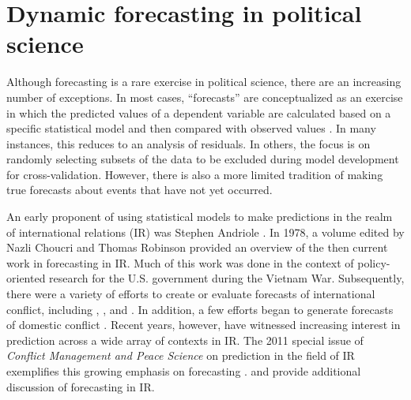 \section{Dynamic forecasting in political science}
Although forecasting is a rare exercise in political science, there
are an increasing number of exceptions.  In most cases, ``forecasts''
are conceptualized as an exercise in which the predicted values of a
dependent variable are calculated based on a specific statistical
model and then compared with observed values
\citep[e.g.,][]{Hildebrand:etal:1976}. In many instances, this reduces
to an analysis of residuals.  In others, the focus is on randomly
selecting subsets of the data to be excluded during model development
for cross-validation.  However, there is also a more limited tradition
of making true forecasts about events that have not yet occurred.

An early proponent of using statistical models to make predictions in
the realm of international relations (IR) was Stephen Andriole
\citep{Andriole:Young:1977}. In 1978, a volume edited by Nazli Choucri
and Thomas Robinson \nocite{Choucri:Robinson:1978} provided an
overview of the then current work in forecasting in IR.  Much of this
work was done in the context of policy-oriented research for the
U.S. government during the Vietnam War.  Subsequently, there were a
variety of efforts to create or evaluate forecasts of international
conflict, including \citet{Freeman:Job:1979},
\citet{Singer:Wallace:1979}, and \citet{Vincent:1980}.  In addition, a
few efforts began to generate forecasts of domestic conflict
\citep[e.g.,][]{Gurr:Lichbach:1986}.  Recent years, however, have
witnessed increasing interest in prediction across a wide array of
contexts in IR.  The 2011 special issue of \emph{Conflict
  Management and Peace Science} on prediction in the field of IR
exemplifies this growing emphasis on forecasting
\citep[c.f.,][]{Schneider_etal_2011, Mesquita_2011,
  Brandt_etal_2011}. 
and
provide additional discussion of forecasting in IR.

